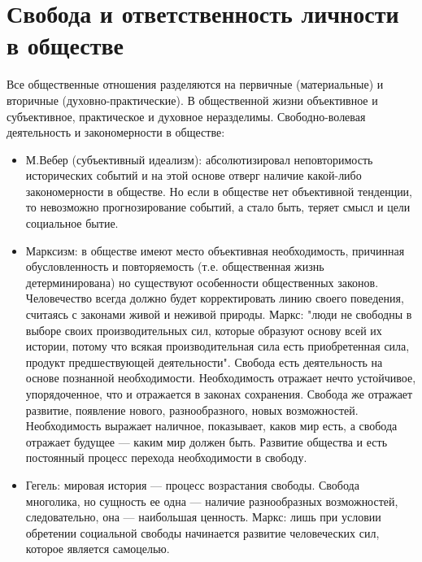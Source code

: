\documentclass[12pt]{article}
\begin{document}
\newpage
\section{Свобода и ответственность личности в обществе}
Все общественные отношения разделяются на первичные (материальные) и вторичные (духовно-практические).
В общественной жизни объективное и субъективное, практическое и духовное неразделимы.
Свободно-волевая деятельность и закономерности в обществе:
\begin{itemize}
  \item М.Вебер (субъективный идеализм): абсолютизировал неповторимость исторических событий и на этой
основе отверг наличие какой-либо закономерности в обществе. Но если в обществе нет объективной тенденции,
то невозможно прогнозирование событий, а стало быть, теряет смысл и цели социальное бытие.
  \item Марксизм:  в  обществе  имеют  место  объективная  необходимость,  причинная  обусловленность  и
повторяемость (т.е. общественная жизнь детерминирована) но существуют особенности общественных законов.
Человечество  всегда должно  будет корректировать  линию своего поведения, считаясь с законами  живой  и
неживой природы. Маркс: "люди не свободны в выборе своих производительных сил, которые образуют основу
всей их истории, потому что всякая производительная сила есть приобретенная сила, продукт предшествующей
деятельности". Свобода есть деятельность на основе познанной необходимости. Необходимость отражает нечто
устойчивое, упорядоченное, что и отражается в законах сохранения. Свобода же отражает развитие, появление
нового, разнообразного, новых возможностей. Необходимость выражает наличное, показывает, каков мир есть,
а свобода отражает будущее --- каким мир должен быть. Развитие общества и есть постоянный процесс перехода
необходимости в свободу.
\item Гегель: мировая история --- процесс возрастания свободы. Свобода многолика, но сущность ее одна --- наличие
разнообразных возможностей, следовательно, она --- наибольшая ценность. Маркс: лишь при условии обретении
социальной свободы начинается развитие человеческих сил, которое является самоцелью.
\end{itemize}

\newpage
\end{document}
